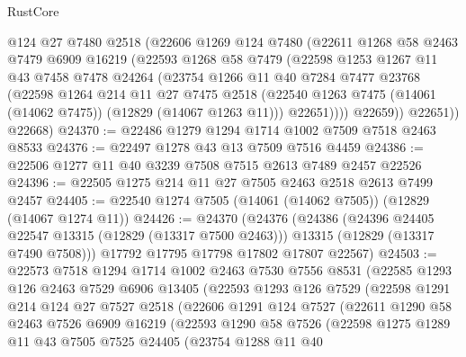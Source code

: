 \begin{lexlean}{RustCore}
\begin{coremodule}
          @124
          @27
          @7480
          @2518
          (@22606
            @1269
            @124
            @7480
            (@22611
              @1268
              @58
              @2463
              @7479
              @6909
              @16219
              (@22593
                @1268
                @58
                @7479
                (@22598
                  @1253
                  @1267
                  @11
                  @43
                  @7458
                  @7478
                  @24264
                  (@23754
                    @1266
                    @11
                    @40
                    @7284
                    @7477
                    @23768
                    (@22598
                      @1264
                      @214
                      @11
                      @27
                      @7475
                      @2518
                      (@22540 @1263 @7475 (@14061 (@14062 @7475)) (@12829 (@14067 @1263 @11)))
                      @22651))))
              @22659))
          @22651))
      @22668)
@24370 := @22486 @1279 @1294 @1714 @1002 @7509 @7518 @2463 @8533
@24376 := @22497 @1278 @43 @13 @7509 @7516 @4459
@24386 := @22506 @1277 @11 @40 @3239 @7508 @7515 @2613 @7489 @2457 @22526
@24396 := @22505 @1275 @214 @11 @27 @7505 @2463 @2518 @2613 @7499 @2457
@24405 := @22540 @1274 @7505 (@14061 (@14062 @7505)) (@12829 (@14067 @1274 @11))
@24426 := @24370
    (@24376
      (@24386
        (@24396 @24405 @22547 @13315 (@12829 (@13317 @7500 @2463)))
        @13315
        (@12829 (@13317 @7490 @7508)))
      @17792
      @17795
      @17798
      @17802
      @17807
      @22567)
@24503 := @22573
    @7518
    @1294
    @1714
    @1002
    @2463
    @7530
    @7556
    @8531
    (@22585
      @1293
      @126
      @2463
      @7529
      @6906
      @13405
      (@22593
        @1293
        @126
        @7529
        (@22598
          @1291
          @214
          @124
          @27
          @7527
          @2518
          (@22606
            @1291
            @124
            @7527
            (@22611
              @1290
              @58
              @2463
              @7526
              @6909
              @16219
              (@22593
                @1290
                @58
                @7526
                (@22598
                  @1275
                  @1289
                  @11
                  @43
                  @7505
                  @7525
                  @24405
                  (@23754
                    @1288
                    @11
                    @40

\end{coremodule}
\end{lexlean}
